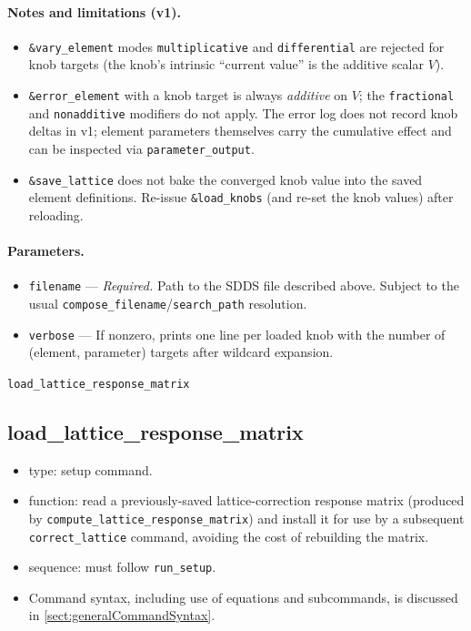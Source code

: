 \documentclass[11pt]{article}
\begin{document}
\paragraph{Notes and limitations (v1).}
\begin{itemize}
\item \verb|&vary_element| modes \verb|multiplicative| and
        \verb|differential| are rejected for knob targets (the knob's
        intrinsic ``current value'' is the additive scalar $V$).
\item \verb|&error_element| with a knob target is always
        \emph{additive} on $V$; the \verb|fractional|
        and \verb|nonadditive| modifiers do not apply.  The error log
        does not record knob deltas in v1; element parameters
        themselves carry the cumulative effect and can be inspected
        via \verb|parameter_output|.
\item \verb|&save_lattice| does not bake the converged knob value
        into the saved element definitions.  Re-issue
        \verb|&load_knobs| (and re-set the knob values) after
        reloading.
\end{itemize}

\paragraph{Parameters.}
\begin{itemize}
\item \verb|filename| --- {\em Required.}  Path to the SDDS file
        described above.  Subject to the usual
        \verb|compose_filename|/\verb|search_path| resolution.
\item \verb|verbose| --- If nonzero, prints one line per loaded knob
        with the number of \linebreak (element, parameter) targets
        after wildcard expansion.
\end{itemize}

\newpage
\begin{center}{\Large\verb|load_lattice_response_matrix|}\end{center}
\subsection{load\_lattice\_response\_matrix \label{subsec:loadlatticeresponsematrix}}

\begin{itemize}
\item type: setup command.
\item function: read a previously-saved lattice-correction response matrix
  (produced by \verb|compute_lattice_response_matrix|) and install it for
  use by a subsequent \verb|correct_lattice| command, avoiding the cost of
  rebuilding the matrix.
\item sequence: must follow \verb|run_setup|.
\item Command syntax, including use of equations and subcommands, is discussed in \ref{sect:generalCommandSyntax}.
\end{itemize}
\end{document}
